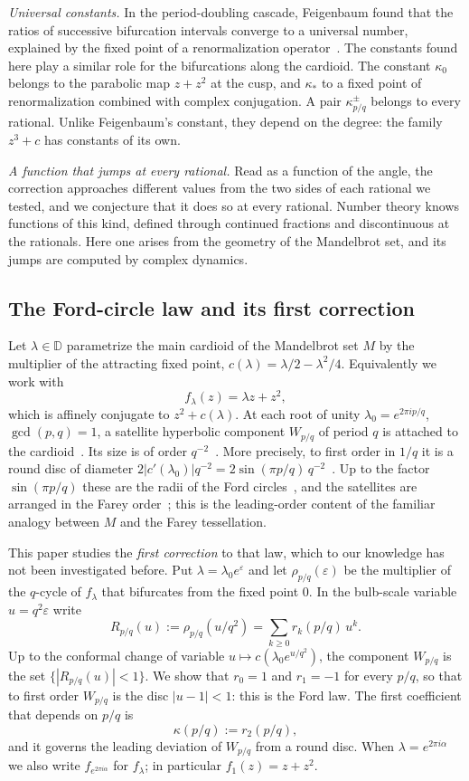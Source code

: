 \documentclass[11pt]{amsart}
\theoremstyle{definition}
\theoremstyle{remark}
\newcommand{\D}{\mathbb{D}}
\newcommand{\fa}[1]{f_{e^{2\pi i#1}}}
\begin{document}
\emph{Universal constants.} In the period-doubling cascade, Feigenbaum found that the ratios of successive bifurcation intervals converge to a universal number, explained by the fixed point of a renormalization operator~\cite{Feigenbaum}. The constants found here play a similar role for the bifurcations along the cardioid. The constant $\kappa_0$ belongs to the parabolic map $z+z^2$ at the cusp, and $\kappa_*$ to a fixed point of renormalization combined with complex conjugation. A pair $\kappa^\pm_{p/q}$ belongs to every rational. Unlike Feigenbaum's constant, they depend on the degree: the family $z^3+c$ has constants of its own.

\emph{A function that jumps at every rational.} Read as a function of the angle, the correction approaches different values from the two sides of each rational we tested, and we conjecture that it does so at every rational. Number theory knows functions of this kind, defined through continued fractions and discontinuous at the rationals. Here one arises from the geometry of the Mandelbrot set, and its jumps are computed by complex dynamics.

\subsection{The Ford-circle law and its first correction}
Let $\lambda\in\D$ parametrize the main cardioid of the Mandelbrot set $M$ by the multiplier of the attracting fixed point, $c(\lambda)=\lambda/2-\lambda^2/4$. Equivalently we work with
\[
f_\lambda(z)=\lambda z+z^2 ,
\]
which is affinely conjugate to $z^2+c(\lambda)$. At each root of unity $\lambda_0=e^{2\pi i p/q}$, $\gcd(p,q)=1$, a satellite hyperbolic component $W_{p/q}$ of period $q$ is attached to the cardioid~\cite{DH}. Its size is of order $q^{-2}$~\cite{GM}. More precisely, to first order in $1/q$ it is a round disc of diameter $2|c'(\lambda_0)|q^{-2}=2\sin(\pi p/q)\,q^{-2}$~\cite{FM}. Up to the factor $\sin(\pi p/q)$ these are the radii of the Ford circles~\cite{Ford}, and the satellites are arranged in the Farey order~\cite{Devaney}; this is the leading-order content of the familiar analogy between $M$ and the Farey tessellation.

This paper studies the \emph{first correction} to that law, which to our knowledge has not been investigated before. Put $\lambda=\lambda_0e^{\varepsilon}$ and let $\rho_{p/q}(\varepsilon)$ be the multiplier of the $q$-cycle of $f_\lambda$ that bifurcates from the fixed point $0$. In the bulb-scale variable $u=q^2\varepsilon$ write
\begin{equation}\label{eq:R}
R_{p/q}(u):=\rho_{p/q}(u/q^2)=\sum_{k\ge0} r_k(p/q)\,u^k .
\end{equation}
Up to the conformal change of variable $u\mapsto c(\lambda_0e^{u/q^2})$, the component $W_{p/q}$ is the set $\{|R_{p/q}(u)|<1\}$. We show that $r_0=1$ and $r_1=-1$ for every $p/q$, so that to first order $W_{p/q}$ is the disc $|u-1|<1$: this is the Ford law. The first coefficient that depends on $p/q$ is
\[
\kappa(p/q):=r_2(p/q),
\]
and it governs the leading deviation of $W_{p/q}$ from a round disc. When $\lambda=e^{2\pi i\alpha}$ we also write $\fa{\alpha}$ for $f_\lambda$; in particular $f_1(z)=z+z^2$.
\end{document}
